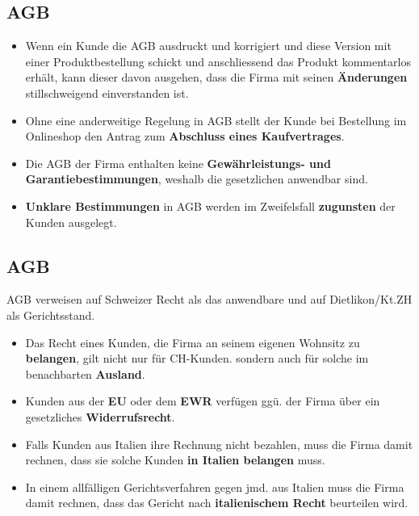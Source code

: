 \subsection{AGB}
\begin{itemize}
	\item Wenn ein Kunde die AGB ausdruckt und korrigiert und diese Version mit einer Produktbestellung schickt und anschliessend das Produkt kommentarlos erhält, kann dieser davon ausgehen, dass die Firma mit seinen \textbf{Änderungen} stillschweigend einverstanden ist.
	\item Ohne eine anderweitige Regelung in AGB stellt der Kunde bei Bestellung im Onlineshop den Antrag zum \textbf{Abschluss eines Kaufvertrages}.
	\item Die AGB der Firma enthalten keine \textbf{Gewährleistungs- und Garantiebestimmungen}, weshalb die gesetzlichen anwendbar sind.
	\item \textbf{Unklare Bestimmungen} in AGB werden im Zweifelsfall \textbf{zugunsten} der Kunden ausgelegt.
\end{itemize}

\subsection{AGB}
AGB verweisen auf Schweizer Recht als das anwendbare und auf Dietlikon/Kt.ZH als Gerichtsstand.
\begin{itemize}
	\item Das Recht eines Kunden, die Firma an seinem eigenen Wohnsitz zu \textbf{belangen}, gilt nicht nur für CH-Kunden. sondern auch für solche im benachbarten \textbf{Ausland}.
	\item Kunden aus der \textbf{EU} oder dem \textbf{EWR} verfügen ggü. der Firma über ein gesetzliches \textbf{Widerrufsrecht}.
	\item Falls Kunden aus Italien ihre Rechnung nicht bezahlen, muss die Firma damit rechnen, dass sie solche Kunden \textbf{in Italien belangen} muss.
	\item In einem allfälligen Gerichtsverfahren gegen jmd. aus Italien muss die Firma damit rechnen, dass das Gericht nach \textbf{italienischem Recht} beurteilen wird.
\end{itemize}

